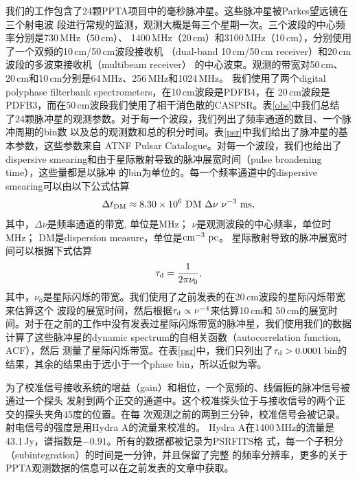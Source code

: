 我们的工作包含了24颗PPTA项目中的毫秒脉冲星。这些脉冲星被Parkes望远镜在三个射电波
段进行常规的监测，观测大概是每三个星期一次。三个波段的中心频率分别是730\,MHz（50\,cm）、
1400\,MHz（20\,cm）和3100\,MHz（10\,cm），分别使用了一个双频的10\,cm/50\,cm波段接收机
（dual-band 10\,cm/50\,cm receiver）和20\,cm波段的多波束接收机（multibeam receiver）
的中心波束。观测的带宽对50\,cm、20\,cm和10\,cm分别是64\,MHz、256\,MHz和1024\,MHz。
我们使用了两个digital polyphase filterbank spectrometers，在10\,cm波段是PDFB4，在
20\,cm波段是PDFB3，而在50\,cm波段我们使用了相干消色散的CASPSR。表\ref{obs}中我们总结
了24颗脉冲星的观测参数。对于每一个波段，我们列出了频率通道的数目、一个脉冲周期的bin数
以及总的观测数和总的积分时间。表\ref{psr}中我们给出了脉冲星的基本参数，这些参数来自
ATNF Pulsar Catalogue\supercite{Manchester05}。对每一个波段，我们也给出了dispersive 
smearing和由于星际散射导致的脉冲展宽时间（pulse broadening time），这些量都是以脉冲
的bin为单位的。每一个频率通道中的dispersive smearing可以由以下公式估算
%
\begin{equation}
\Delta t_{\rm{DM}}\approx 8.30 \times 10^{6}\ \rm{DM}\ \Delta \nu\ \nu^{-3}\ \rm{ms},
\label{dm}
\end{equation}
%
其中，$\Delta \nu$是频率通道的带宽, 单位是MHz； $\nu$是观测波段的中心频率，单位时MHz； 
DM是dispersion measure，单位是$\rm{cm^{-3}\ pc}$。
%
星际散射导致的脉冲展宽时间可以根据下式估算
%
\begin{equation}
\tau_{\rm{d}} = \frac{1}{2\pi\nu_0},
\end{equation}
%
其中，$\nu_0$是星际闪烁的带宽。我们使用了之前发表的在20\,cm波段的星际闪烁带宽来估算这个
波段的展宽时间\supercite{Keith13}，然后根据$\tau_{\rm{d}}\propto\nu^{-4}$来估算10\,cm和
50\,cm的展宽时间。对于在之前的工作中没有发表过星际闪烁带宽的脉冲星，我们使用我们的数据
计算了这些脉冲星的dynamic spectrum的自相关函数（autocorrelation function, ACF），然后
测量了星际闪烁带宽\supercite{Wang05}。在表\ref{psr}中，我们只列出了$\tau_{\rm{d}}>0.0001$\,bin的结果，其余的结果由于远小于一个phase bin，所以近似为零。

为了校准信号接收系统的增益（gain）和相位，一个宽频的、线偏振的脉冲信号被通过一个探头
发射到两个正交的通道中。这个校准探头位于与接收信号的两个正交的探头夹角45度的位置。在每
次观测之前的两到三分钟，校准信号会被记录。射电信号的强度是用Hydra A的流量来校准的。
Hydra A在1400\,MHz的流量是43.1\,Jy，谱指数是$-0.91$。所有的数据都被记录为PSRFITS格
式\supercite{Hotan04}，每一个子积分（subintegration）的时间是一分钟，并且保留了完整
的频率分辨率，更多的关于PPTA观测数据的信息可以在之前发表的文章中获取\supercite{Manchester13}。

